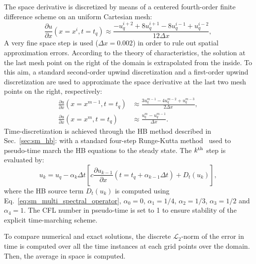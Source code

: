 The space derivative is discretized by means of a centered 
fourth-order finite difference scheme on an uniform Cartesian mesh:
\begin{equation}
    \frac{\partial u}{\partial x} (x = x^i, t=t_q) \approx 
    \frac{-u^{i+2}_{q} + 8 u^{i+1}_{q} - 8 u^{i-1}_{q} + u^{i-2}_{q}}{12\Delta x},
    \label{eq:convection_center4}
\end{equation}
A very fine space step is used ($\Delta x=0.002$) in order to rule 
out spatial approximation errors. According to the theory 
of characteristics, the solution at the last mesh 
point on the right of the domain is extrapolated 
from the inside. To this aim, a standard second-order 
upwind discretization and a first-order upwind discretization 
are used to approximate the space derivative at 
the last two mesh points on the right, respectively:
\begin{align}
    \frac{\partial u}{\partial x} (x = x^{m-1}, t=t_q) &\approx 
    \frac{3 u^{m-1}_{q} - 4 u^{m-2}_{q} + u^{m-3}_{q}}{2\Delta x}, \\
    \frac{\partial u}{\partial x} (x = x^m, t=t_q) &\approx 
    \frac{u^{m}_{q} - u^{m-1}_{q}}{\Delta x}.
\label{eq:upwind_scheme}
\end{align}
Time-discretization is achieved 
through the HB method described in Sec.~\ref{sec:sm_hb}:
with a standard four-step Runge-Kutta method~\cite{Jameson1981}
used to pseudo-time 
march the HB equations to the steady state.
The $k\textsuperscript{th}$ step is evaluated by:
\begin{equation}
    u_k = u_q - \alpha_k \Delta t \left [ 
          c \frac{\partial u_{k-1}}{\partial x} (t=t_q + \alpha_{k-1} \Delta t)
          + D_t(u_k)
          \right],
    \label{eq:convection_rk4}
\end{equation}
where the HB source term $D_t(u_k)$ is computed using Eq.~\eqref{eq:sm_multi_spectral_operator},
$\alpha_0 = 0$, $\alpha_1 = 1/4$, 
$\alpha_2 = 1/3$, $\alpha_3 = 1/2$ and $\alpha_4 = 1$.
The CFL number in pseudo-time is set to 1 
to ensure stability of the explicit time-marching scheme.

To compare numerical and exact solutions, 
the discrete $\mathcal{L}_2$-norm of the error 
in time is computed over all the time instances
at each grid points over the domain.
Then, the average in 
space is computed.


